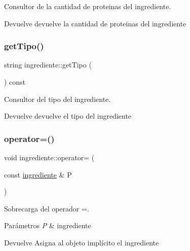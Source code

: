 Consultor de la cantidad de proteinas del ingrediente. 

\begin{DoxyReturn}{Devuelve}
devuelve la cantidad de proteinas del ingrediente 
\end{DoxyReturn}
\mbox{\label{classingrediente_a03334e887add1dbdc7991de77234ede7}} 
\subsubsection{\texorpdfstring{get\+Tipo()}{getTipo()}}
{\footnotesize\ttfamily string ingrediente\+::get\+Tipo (\begin{DoxyParamCaption}{ }\end{DoxyParamCaption}) const}



Consultor del tipo del ingrediente. 

\begin{DoxyReturn}{Devuelve}
devuelve el tipo del ingrediente 
\end{DoxyReturn}
\mbox{\label{classingrediente_a0556714d34bdd366599fc02758b6d046}} 
\subsubsection{\texorpdfstring{operator=()}{operator=()}}
{\footnotesize\ttfamily void ingrediente\+::operator= (\begin{DoxyParamCaption}\item[{const \hyperlink{classingrediente}{ingrediente} \&}]{P }\end{DoxyParamCaption})}



Sobrecarga del operador =. 


\begin{DoxyParams}{Parámetros}
{\em P} & ingrediente \\
\hline
\end{DoxyParams}
\begin{DoxyReturn}{Devuelve}
Asigna al objeto implícito el ingrediente 
\end{DoxyReturn}
\mbox{\label{classingrediente_aa3bc521369e0ba37383ca0958697f5af}} 
